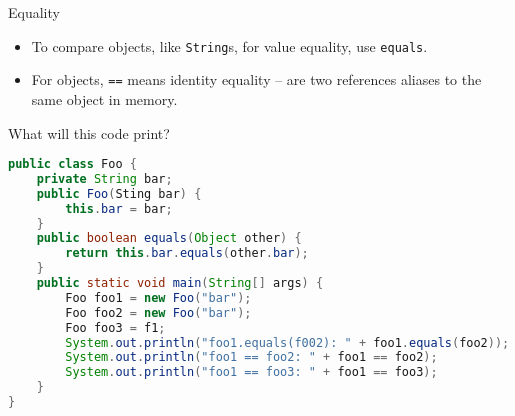\documentclass{beamer}
\begin{document}
\begin{frame}[fragile]{Equality}
\vspace{-.05in}
\begin{itemize}
\item To compare objects, like {\tt String}s, for value equality, use {\tt equals}.
\item For objects, {\tt ==} means identity equality -- are two references aliases to the same object in memory.
\end{itemize}

What will this code print?
\begin{lstlisting}[language=Java]
public class Foo {
    private String bar;
    public Foo(Sting bar) {
        this.bar = bar;
    }
    public boolean equals(Object other) {
        return this.bar.equals(other.bar);
    }
    public static void main(String[] args) {
        Foo foo1 = new Foo("bar");
        Foo foo2 = new Foo("bar");
        Foo foo3 = f1;
        System.out.println("foo1.equals(f002): " + foo1.equals(foo2));
        System.out.println("foo1 == foo2: " + foo1 == foo2);
        System.out.println("foo1 == foo3: " + foo1 == foo3);
    }
}
\end{lstlisting}

\end{frame}







\end{document}
